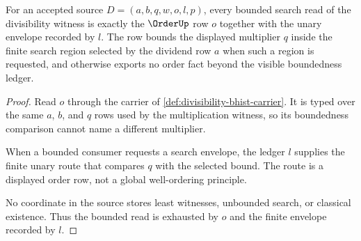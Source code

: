 \begin{theorem}
\label{thm:divisibility-order-bounded-ledger}
For an accepted source $D=(a,b,q,w,o,l,p)$, every bounded search read of the
divisibility witness is exactly the $\OrderUp$ row $o$ together with the
unary envelope recorded by $l$. The row bounds the displayed multiplier $q$
inside the finite search region selected by the dividend row $a$ when such a
region is requested, and otherwise exports no order fact beyond the visible
boundedness ledger.
\end{theorem}
\begin{proof}
Read $o$ through the carrier of \autoref{def:divisibility-bhist-carrier}. It
is typed over the same $a$, $b$, and $q$ rows used by the multiplication
witness, so its boundedness comparison cannot name a different multiplier.

When a bounded consumer requests a search envelope, the ledger $l$ supplies
the finite unary route that compares $q$ with the selected bound. The route is
a displayed order row, not a global well-ordering principle.

No coordinate in the source stores least witnesses, unbounded search, or
classical existence. Thus the bounded read is exhausted by $o$ and the finite
envelope recorded by $l$.
\end{proof}

